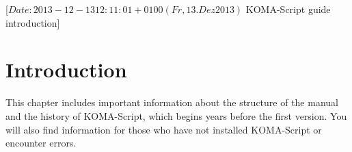 %
%
%
%
%
%
%
%
% 
%
%
%
%

                 [$Date: 2013-12-13 12:11:01 +0100 (Fr, 13. Dez 2013) $
                  KOMA-Script guide introduction]


\chapter{Introduction}

This chapter includes important information about the structure of the manual
and the history of KOMA-Script, which begins years before the first
version. You will also find information for those who have not installed
KOMA-Script or encounter errors.

